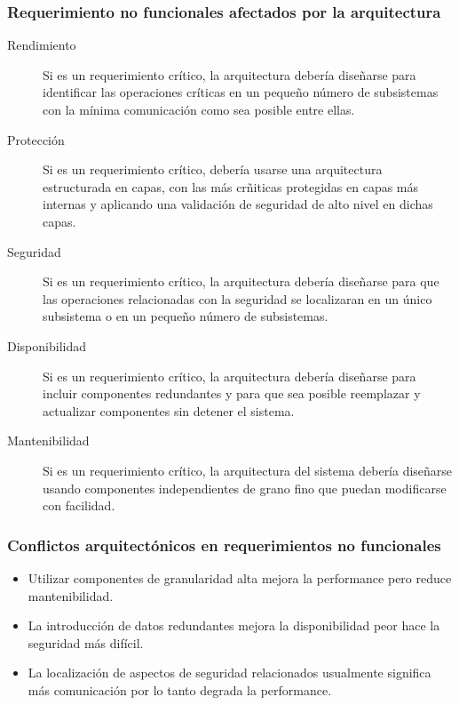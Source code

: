 \subsubsection{Requerimiento no funcionales afectados por la arquitectura}
\begin{description}
	\item[Rendimiento] Si es un requerimiento crítico, la arquitectura debería diseñarse para identificar las operaciones críticas en un pequeño número de subsistemas con la mínima comunicación como sea posible entre ellas.
	\item[Protección] Si es un requerimiento crítico, debería usarse una arquitectura estructurada en capas, con las más crñiticas protegidas en capas más internas y aplicando una validación de seguridad de alto nivel en dichas capas.
	\item[Seguridad] Si es un requerimiento crítico, la arquitectura debería diseñarse para que las operaciones relacionadas con la seguridad se localizaran en un único subsistema o en un pequeño número de subsistemas.
	\item[Disponibilidad] Si es un requerimiento crítico, la arquitectura debería diseñarse para incluir componentes redundantes y para que sea posible reemplazar y actualizar componentes sin detener el sistema.
	\item[Mantenibilidad] Si es un requerimiento crítico, la arquitectura del sistema debería diseñarse usando componentes independientes de grano fino que puedan modificarse con facilidad.
\end{description}
\subsubsection{Conflictos arquitectónicos en requerimientos no funcionales}
\begin{itemize}
	\item Utilizar componentes de granularidad alta mejora la performance pero reduce mantenibilidad.
	\item La introducción de datos redundantes mejora la disponibilidad peor hace la seguridad más difícil.
	\item La localización de aspectos de seguridad relacionados usualmente significa más comunicación por lo tanto degrada la performance.
\end{itemize}
